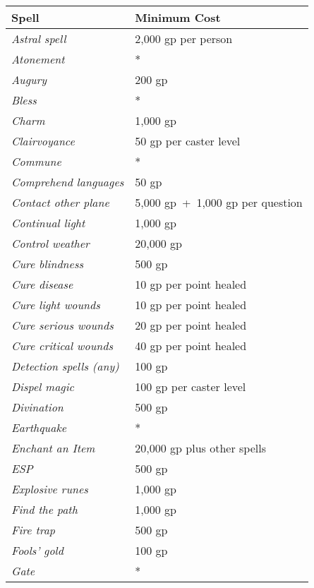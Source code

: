 \begin{multicols}{2}
\begin{minipage}{\columnwidth}
\label{spellservices}
\noindent
\begin{tabular}{|p{}|p{}|}
\hline
Spell	& Minimum Cost \\
\hline\hline
\rowcolor[gray]{.9}\textit{Astral spell}	& 2,000 gp per person \\
\textit{Atonement}	& * \\
\rowcolor[gray]{.9}\textit{Augury}	& 200 gp \\
\textit{Bless}	& * \\
\rowcolor[gray]{.9}\textit{Charm}	& 1,000 gp \\
\textit{Clairvoyance}	& 50 gp per caster level \\
\rowcolor[gray]{.9}\textit{Commune}	& * \\
\textit{Comprehend languages}	& 50 gp \\
\rowcolor[gray]{.9}\textit{Contact other plane}	& 5,000 gp~+~1,000 gp per question \\
\textit{Continual light}	& 1,000 gp \\
\rowcolor[gray]{.9}\textit{Control weather}	& 20,000 gp \\
\textit{Cure blindness}	& 500 gp \\
\rowcolor[gray]{.9}\textit{Cure disease}	& 10 gp per point healed \\
\textit{Cure light wounds}	& 10 gp per point healed \\
\rowcolor[gray]{.9}\textit{Cure serious wounds}	& 20 gp per point healed \\
\textit{Cure critical wounds}	& 40 gp per point healed \\
\rowcolor[gray]{.9}\textit{Detection spells (any)}	& 100 gp \\
\textit{Dispel magic}	& 100 gp per caster level \\
\rowcolor[gray]{.9}\textit{Divination}	& 500 gp \\
\textit{Earthquake}	& * \\
\rowcolor[gray]{.9}\textit{Enchant an Item}	& 20,000 gp plus other spells \\
\textit{ESP}	& 500 gp \\
\rowcolor[gray]{.9}\textit{Explosive runes}	& 1,000 gp \\
\textit{Find the path}	& 1,000 gp \\
\rowcolor[gray]{.9}\textit{Fire trap}	& 500 gp \\
\textit{Fools' gold}	& 100 gp \\
\rowcolor[gray]{.9}\textit{Gate}	& * \\

\end{tabular}
\end{minipage}
\end{multicols}
